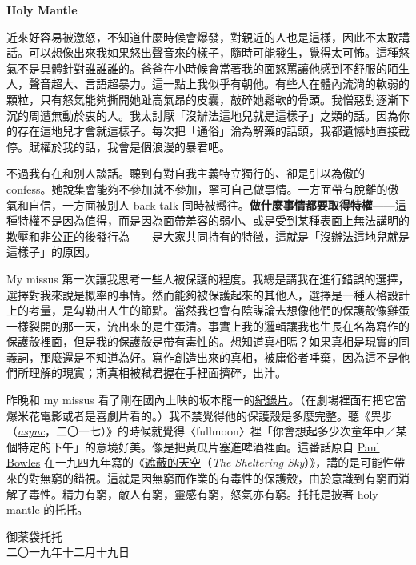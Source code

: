 \documentclass[10pt]{article}
\begin{document}
\begin{flushleft}
\textbf{Holy Mantle}\\
\end{flushleft}
\vspace{3em}

近來好容易被激怒，不知道什麼時候會爆發，對親近的人也是這樣，因此不太敢講話。可以想像出來我如果怒出聲音來的樣子，隨時可能發生，覺得太可怖。這種怒氣不是具體針對誰誰誰的。爸爸在小時候會當著我的面怒罵讓他感到不舒服的陌生人，聲音超大、言語超暴力。這一點上我似乎有朝他。有些人在體內流淌的軟弱的顆粒，只有怒氣能夠撕開她趾高氣昂的皮囊，敲碎她鬆軟的骨頭。我憎惡對逐漸下沉的周遭無動於衷的人。我太討厭「沒辦法這地兒就是這樣子」之類的話。因為你的存在這地兒才會就這樣子。每次把「通俗」淪為解藥的話頭，我都遺憾地直接截停。賦權於我的話，我會是個浪漫的暴君吧。

不過我有在和別人談話。聽到有對自我主義特立獨行的、卻是引以為傲的
confess。她說集會能夠不參加就不參加，寧可自己做事情。一方面帶有脫離的傲氣和自信，一方面被別人
back talk
同時被嚮往。\textbf{做什麼事情都要取得特權}{——}這種特權不是因為值得，而是因為面帶羞容的弱小、或是受到某種表面上無法講明的欺壓和非公正的後發行為{——}是大家共同持有的特徵，這就是「沒辦法這地兒就是這樣子」的原因。

My missus
第一次讓我思考一些人被保護的程度。我總是講我在進行錯誤的選擇，選擇對我來說是概率的事情。然而能夠被保護起來的其他人，選擇是一種人格設計上的考量，是勾勒出人生的節點。當然我也會有陰謀論去想像他們的保護殼像雞蛋一樣裂開的那一天，流出來的是生蛋清。事實上我的邏輯讓我也生長在名為寫作的保護殼裡面，但是我的保護殼是帶有毒性的。想知道真相嗎？如果真相是現實的同義詞，那麼還是不知道為好。寫作創造出來的真相，被庸俗者唾棄，因為這不是他們所理解的現實；斯真相被弒君握在手裡面擠碎，出汁。

昨晚和 my missus
看了剛在國內上映的{坂}本龍一的\href{https://www.imdb.com/title/tt6578572/}{紀錄片}。（在劇場裡面有把它當爆米花電影或者是喜劇片看的。）我不禁覺得他的保護殼是多麼完整。聽《異步（\href{https://en.wikipedia.org/wiki/Async}{\emph{async}}，二〇一七）》的時候就覺得〈fullmoon〉裡「你會想起多少次童年中／某個特定的下午」的意境好美。像是把黃瓜片塞進啤酒裡面。這番話原自
\href{https://en.wikiquote.org/wiki/Paul_Bowles}{Paul Bowles}
在一九四九年寫的《\href{https://en.wikipedia.org/wiki/The_Sheltering_Sky}{遮蔽的天空}（\emph{The
Sheltering
Sky}）》，講的是可能性帶來的對無窮的錯視。這就是因無窮而作業的有毒性的保護殼，由於意識到有窮而消解了毒性。精力有窮，敵人有窮，靈感有窮，怒氣亦有窮。托托是披著
holy mantle 的托托。

\vspace{3em}
\begin{flushleft}
\small{御薬袋托托\\
二〇一九年十二月十九日}
\end{flushleft}
\end{document}
